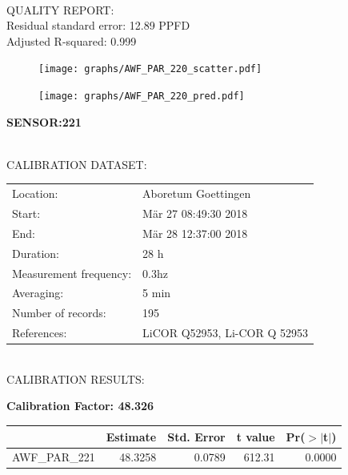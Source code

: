 \documentclass[oneside]{report}
\begin{document}
\hrulefill\\
QUALITY REPORT:\\
Residual standard error: 12.89 PPFD\\
Adjusted R-squared: 0.999



\begin{figure}[H]
  \centering
  \texttt{[image: graphs/AWF\_PAR\_220\_scatter.pdf]}
\end{figure}




\begin{figure}[H]
  \centering
  \texttt{[image: graphs/AWF\_PAR\_220\_pred.pdf]}
\end{figure}

\pagebreak


\begin{center}
\large{\textbf{SENSOR:221}}\\
\end{center}

\hrulefill\\
CALIBRATION DATASET:\\
\begin{table}[h!]
  \centering
  \label{tab:table1}
  \begin{tabular}{ll}
    Location: & Aboretum Goettingen\\ 
    
    
    Start:  & Mär 27 08:49:30 2018 \\
    End:   & Mär 28 12:37:00 2018\\ 
    Duration: & 28 h\\
    Measurement frequency: & 0.3hz\\
    Averaging:  &5 min\\
    Number of records: & 195 \\
    References: & LiCOR Q52953, Li-COR Q 52953 \\
  \end{tabular}
\end{table}

\hrulefill\\
CALIBRATION RESULTS:\\


\begin{center}
\textbf{\large{Calibration Factor: 48.326}}\\
\end{center}
\begin{table}[ht]
\centering
\begin{tabular}{rrrrr}
  \hline
 & Estimate & Std. Error & t value & Pr($>$$|$t$|$) \\ 
  \hline
AWF\_PAR\_221 & 48.3258 & 0.0789 & 612.31 & 0.0000 \\ 
   \hline
\end{tabular}
\end{table}
\end{document}
